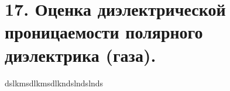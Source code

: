 	
\section*{17. Оценка диэлектрической проницаемости полярного диэлектрика (газа).}
dslkmsdlkmsdlkndslndslnds

